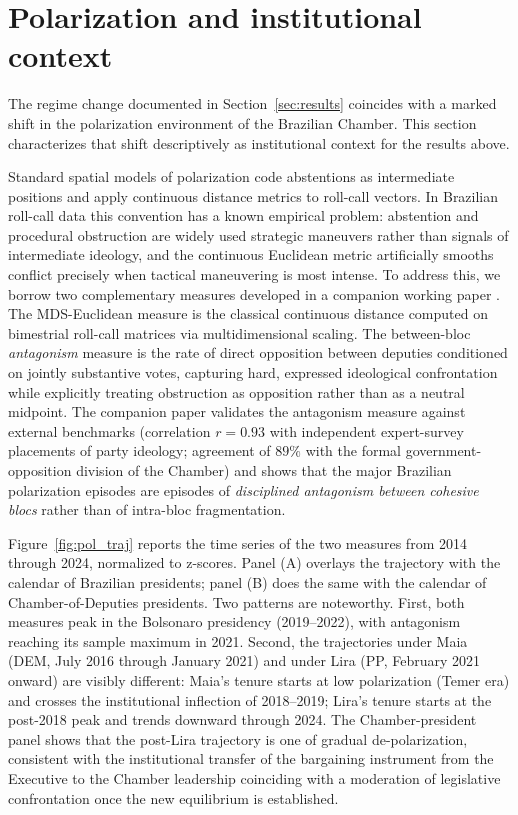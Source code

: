 \documentclass[preprint,12pt,authoryear]{elsarticle}
\begin{document}
\section{Polarization and institutional context}
\label{sec:polarization}

The regime change documented in Section~\ref{sec:results} coincides with a marked shift in the polarization environment of the Brazilian Chamber. This section characterizes that shift descriptively as institutional context for the results above.

Standard spatial models of polarization code abstentions as intermediate positions and apply continuous distance metrics to roll-call vectors. In Brazilian roll-call data this convention has a known empirical problem: abstention and procedural obstruction are widely used strategic maneuvers rather than signals of intermediate ideology, and the continuous Euclidean metric artificially smooths conflict precisely when tactical maneuvering is most intense. To address this, we borrow two complementary measures developed in a companion working paper \citep{AlbuquerqueSousaCajueiroMueller2026WP}. The MDS-Euclidean measure is the classical continuous distance computed on bimestrial roll-call matrices via multidimensional scaling. The between-bloc \emph{antagonism} measure is the rate of direct opposition between deputies conditioned on jointly substantive votes, capturing hard, expressed ideological confrontation while explicitly treating obstruction as opposition rather than as a neutral midpoint. The companion paper validates the antagonism measure against external benchmarks (correlation $r = 0.93$ with independent expert-survey placements of party ideology; agreement of $89\%$ with the formal government-opposition division of the Chamber) and shows that the major Brazilian polarization episodes are episodes of \emph{disciplined antagonism between cohesive blocs} rather than of intra-bloc fragmentation.

Figure~\ref{fig:pol_traj} reports the time series of the two measures from 2014 through 2024, normalized to z-scores. Panel (A) overlays the trajectory with the calendar of Brazilian presidents; panel (B) does the same with the calendar of Chamber-of-Deputies presidents. Two patterns are noteworthy. First, both measures peak in the Bolsonaro presidency (2019--2022), with antagonism reaching its sample maximum in 2021. Second, the trajectories under Maia (DEM, July 2016 through January 2021) and under Lira (PP, February 2021 onward) are visibly different: Maia's tenure starts at low polarization (Temer era) and crosses the institutional inflection of 2018--2019; Lira's tenure starts at the post-2018 peak and trends downward through 2024. The Chamber-president panel shows that the post-Lira trajectory is one of gradual de-polarization, consistent with the institutional transfer of the bargaining instrument from the Executive to the Chamber leadership coinciding with a moderation of legislative confrontation once the new equilibrium is established.
\end{document}
